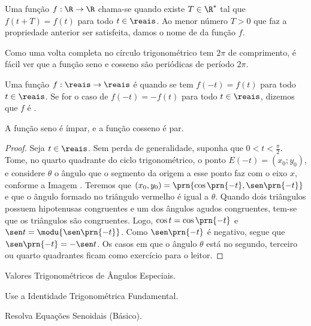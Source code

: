 \begin{definition}
\label{def:funcao-periodica}
    Uma função $f: \R \to \R$ chama-se  quando existe $T
\in \R^\ast$ tal que $f(t + T) = f(t)$ para todo $t \in \reais$. Ao
menor número $T>0$ que faz a propriedade anterior ser satisfeita,
damos o nome de  da função $f$.
\end{definition}

\begin{remark}
    Como uma volta completa no círculo trigonométrico tem $2 \pi$ de
comprimento, é fácil ver que a função seno e cosseno são periódicas
de período $2\pi$.
\end{remark}

\begin{definition}
\label{def:funcao-par-impar}
    Uma função $f: \reais \to \reais$ é  quando se tem $f(-t) = f(t)$
para todo $t\in \reais$. Se for o caso de $f(-t) = - f(t)$ para todo $t
\in \reais$, dizemos que $f$ é .
\end{definition}

 \begin{proposition}
     A função seno é ímpar, e a função cosseno é par.
 \end{proposition}

\begin{proof}
    Seja $t \in \reais$. Sem perda de generalidade, suponha que $0 < t < \frac \pi 2$.
    Tome, no quarto quadrante do ciclo trigonométrico, o ponto $E(-t) = (x_0; y_0)$, e considere 
    $\theta$ o ângulo que o segmento da origem a esse ponto faz com o eixo $x$, conforme a Imagem . %
    Teremos que $(x_0, y_0) =\prn{\cos\prn{-t}, \sen\prn{-t}}$ e que o ângulo formado no triângulo vermelho é igual a $\theta$.
    Quando dois triângulos possuem hipotenusas congruentes e um dos ângulos agudos congruentes, tem-se que os triângulos são congruentes.
    Logo, $\cos t = \cos\prn{-t}$ e $\sen t = \modu{\sen\prn{- t}}$. Como $\sen\prn{-t}$ é negativo, segue que 
    $\sen\prn{-t} = -\sen t$. Os casos em que o ângulo $\theta$ está no segundo, terceiro ou quarto quadrantes ficam como exercício 
    para o leitor.
\end{proof}

\begin{onlineact}
    {Valores Trigonométricos de Ângulos Especiais}.
\end{onlineact}

\begin{onlineact}
    {Use a Identidade Trigonométrica Fundamental}.
\end{onlineact}

\begin{onlineact}
    {Resolva Equações Senoidais (Básico)}.
\end{onlineact}
